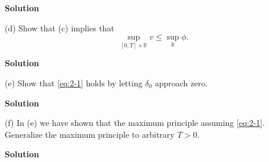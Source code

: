 \documentclass{article}
\begin{document}
\textbf{Solution}

\vspace{5mm}

(d) Show that (c) implies that
%
\begin{equation*}
    \sup_{[0, T] \times \mathbb{R}} v \leq \sup_\mathbb{R} \phi
    .
\end{equation*}

\textbf{Solution}

\vspace{5mm}

(e) Show that \eqref{eq:2-1} holds by letting $\delta_0$ approach zero.

\textbf{Solution}

\vspace{5mm}

(f) In (e) we have shown that the maximum principle assuming
\eqref{eq:2-1}. Generalize the maximum principle to arbitrary $T > 0$.

\textbf{Solution}
\end{document}
